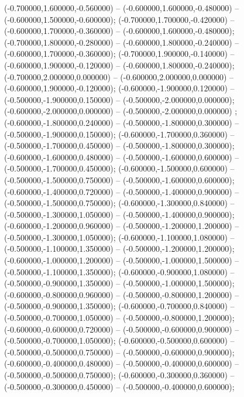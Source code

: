  (-0.700000,1.600000,-0.560000) -- (-0.600000,1.600000,-0.480000) -- (-0.600000,1.500000,-0.600000);
 (-0.700000,1.700000,-0.420000) -- (-0.600000,1.700000,-0.360000) -- (-0.600000,1.600000,-0.480000);
 (-0.700000,1.800000,-0.280000) -- (-0.600000,1.800000,-0.240000) -- (-0.600000,1.700000,-0.360000);
 (-0.700000,1.900000,-0.140000) -- (-0.600000,1.900000,-0.120000) -- (-0.600000,1.800000,-0.240000);
 (-0.700000,2.000000,0.000000) -- (-0.600000,2.000000,0.000000) -- (-0.600000,1.900000,-0.120000);
 (-0.600000,-1.900000,0.120000) -- (-0.500000,-1.900000,0.150000) -- (-0.500000,-2.000000,0.000000);
 (-0.600000,-2.000000,0.000000) -- (-0.500000,-2.000000,0.000000) ;
 (-0.600000,-1.800000,0.240000) -- (-0.500000,-1.800000,0.300000) -- (-0.500000,-1.900000,0.150000);
 (-0.600000,-1.700000,0.360000) -- (-0.500000,-1.700000,0.450000) -- (-0.500000,-1.800000,0.300000);
 (-0.600000,-1.600000,0.480000) -- (-0.500000,-1.600000,0.600000) -- (-0.500000,-1.700000,0.450000);
 (-0.600000,-1.500000,0.600000) -- (-0.500000,-1.500000,0.750000) -- (-0.500000,-1.600000,0.600000);
 (-0.600000,-1.400000,0.720000) -- (-0.500000,-1.400000,0.900000) -- (-0.500000,-1.500000,0.750000);
 (-0.600000,-1.300000,0.840000) -- (-0.500000,-1.300000,1.050000) -- (-0.500000,-1.400000,0.900000);
 (-0.600000,-1.200000,0.960000) -- (-0.500000,-1.200000,1.200000) -- (-0.500000,-1.300000,1.050000);
 (-0.600000,-1.100000,1.080000) -- (-0.500000,-1.100000,1.350000) -- (-0.500000,-1.200000,1.200000);
 (-0.600000,-1.000000,1.200000) -- (-0.500000,-1.000000,1.500000) -- (-0.500000,-1.100000,1.350000);
 (-0.600000,-0.900000,1.080000) -- (-0.500000,-0.900000,1.350000) -- (-0.500000,-1.000000,1.500000);
 (-0.600000,-0.800000,0.960000) -- (-0.500000,-0.800000,1.200000) -- (-0.500000,-0.900000,1.350000);
 (-0.600000,-0.700000,0.840000) -- (-0.500000,-0.700000,1.050000) -- (-0.500000,-0.800000,1.200000);
 (-0.600000,-0.600000,0.720000) -- (-0.500000,-0.600000,0.900000) -- (-0.500000,-0.700000,1.050000);
 (-0.600000,-0.500000,0.600000) -- (-0.500000,-0.500000,0.750000) -- (-0.500000,-0.600000,0.900000);
 (-0.600000,-0.400000,0.480000) -- (-0.500000,-0.400000,0.600000) -- (-0.500000,-0.500000,0.750000);
 (-0.600000,-0.300000,0.360000) -- (-0.500000,-0.300000,0.450000) -- (-0.500000,-0.400000,0.600000);
